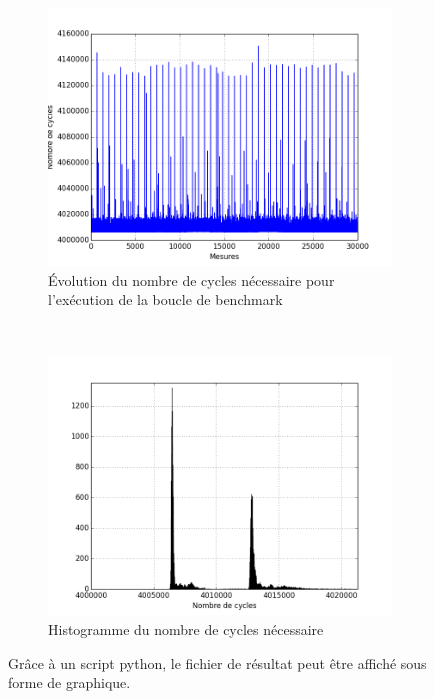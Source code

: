         \begin{figure}
            \centering
            \begin{subfigure}[b]{0.45\linewidth}
                \includegraphics[width=\linewidth]{images/kg_plot.png}
                \caption{Évolution du nombre de cycles nécessaire pour l'exécution de la boucle de benchmark}
                \label{pic_kg_plot}
            \end{subfigure}
            ~ %
            \begin{subfigure}[b]{0.45\linewidth}
                \includegraphics[width=\linewidth]{images/kg_hist.png}
                \caption{Histogramme du nombre de cycles nécessaire}
                \label{pic_kg_hist}
            \end{subfigure}
            \caption{Grâce à un script python, le fichier de résultat peut être affiché sous forme de graphique. }\label{fig:kg_graph}
        \end{figure}
    

